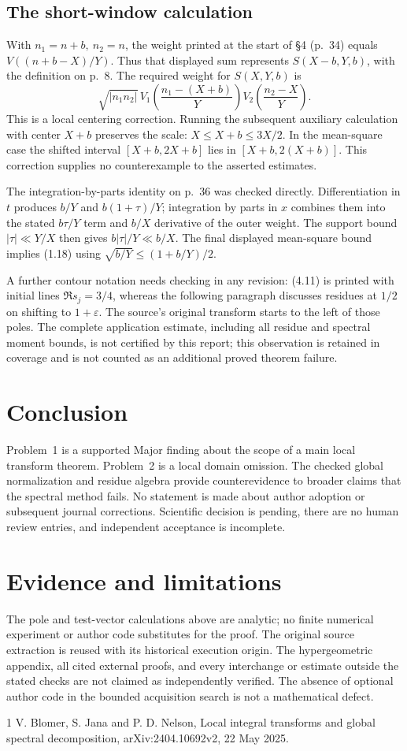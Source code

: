 \documentclass[10pt]{article}
\begin{document}
\subsection*{The short-window calculation}
With \(n_1=n+b,\ n_2=n\), the weight printed at the start of §4 (p. 34) equals \(V((n+b-X)/Y)\). Thus that displayed sum represents \(S(X-b,Y,b)\), with the definition on p. 8. The required weight for \(S(X,Y,b)\) is \[\sqrt{|n_1n_2|}\,
 V_1\!\left(\frac{n_1-(X+b)}Y\right)
 V_2\!\left(\frac{n_2-X}Y\right).\] This is a local centering correction. Running the subsequent auxiliary calculation with center \(X+b\) preserves the scale: \(X\le X+b\le3X/2\). In the mean-square case the shifted interval \([X+b,2X+b]\) lies in \([X+b,2(X+b)]\). This correction supplies no counterexample to the asserted estimates.\par
The integration-by-parts identity on p. 36 was checked directly. Differentiation in \(t\) produces \(b/Y\) and \(b(1+\tau)/Y\); integration by parts in \(x\) combines them into the stated \(b\tau/Y\) term and \(b/X\) derivative of the outer weight. The support bound \(|\tau|\ll Y/X\) then gives \(b|\tau|/Y\ll b/X\). The final displayed mean-square bound implies (1.18) using \(\sqrt{b/Y}\le(1+b/Y)/2\).\par
A further contour notation needs checking in any revision: (4.11) is printed with initial lines \(\Re s_j=3/4\), whereas the following paragraph discusses residues at \(1/2\) on shifting to \(1+\varepsilon\). The source’s original transform starts to the left of those poles. The complete application estimate, including all residue and spectral moment bounds, is not certified by this report; this observation is retained in coverage and is not counted as an additional proved theorem failure.\par
\section*{Conclusion}
Problem 1 is a supported Major finding about the scope of a main local transform theorem. Problem 2 is a local domain omission. The checked global normalization and residue algebra provide counterevidence to broader claims that the spectral method fails. No statement is made about author adoption or subsequent journal corrections. Scientific decision is pending, there are no human review entries, and independent acceptance is incomplete.\par
\section*{Evidence and limitations}
The pole and test-vector calculations above are analytic; no finite numerical experiment or author code substitutes for the proof. The original source extraction is reused with its historical execution origin. The hypergeometric appendix, all cited external proofs, and every interchange or estimate outside the stated checks are not claimed as independently verified. The absence of optional author code in the bounded acquisition search is not a mathematical defect.\par
1 V. Blomer, S. Jana and P. D. Nelson, Local integral transforms and global spectral decomposition, arXiv:2404.10692v2, 22 May 2025.\par
\end{document}
